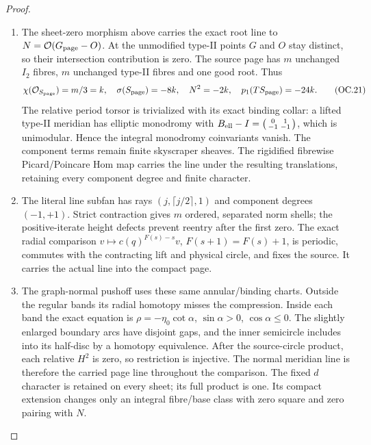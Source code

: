 \begin{proof}
\begin{enumerate}[label=\arabic*.]
\par

\medskip\noindent\textbf{5. The actual component line, cap markings and physical pair}

\par\nobreak

\item The sheet-zero morphism above carries the exact root line to
\(N=\mathcal O(G_{\rm page}-O)\). At the unmodified type-II points
\(G\) and \(O\) stay distinct, so their intersection contribution
is zero. The source page has \(m\) unchanged \(I_2\) fibres,
\(m\) unchanged type-II fibres and one good root. Thus
\[
\chi(\mathcal O_{S_{\rm page}})=m/3=k,\quad
\sigma(S_{\rm page})=-8k,\quad N^2=-2k,
\quad p_1(TS_{\rm page})=-24k.
\tag{OC.21}
\]
The relative period torsor is trivialized with its exact binding
collar: a lifted type-II meridian has elliptic monodromy with
\(B_{\rm ell}-I=\left(\begin{smallmatrix}0&1\\-1&-1\end{smallmatrix}\right)\),
which is unimodular. Hence the integral monodromy coinvariants
vanish. The component terms remain finite skyscraper sheaves.
The rigidified fibrewise Picard/Poincare Hom map carries the line
under the resulting translations, retaining every component degree
and finite character.

\item The literal line subfan has rays \((j,\lceil j/2\rceil,1)\) and
component degrees \((-1,+1)\). Strict contraction gives \(m\)
ordered, separated norm shells; the positive-iterate height defects
prevent reentry after the first zero. The exact radial comparison
\(v\mapsto c(q)^{F(s)-s}v\), \(F(s+1)=F(s)+1\), is periodic,
commutes with the contracting lift and physical circle, and fixes
the source. It carries the actual line into the compact page.

\item The graph-normal pushoff uses these same annular/binding charts.
Outside the regular bands its radial homotopy misses the compression.
Inside each band the exact equation is
\(\rho=-\eta_0\cot\alpha\), \(\sin\alpha>0\), \(\cos\alpha\le0\).
The slightly enlarged boundary arcs have disjoint gaps, and the
inner semicircle includes into its half-disc by a homotopy
equivalence. After the source-circle product, each relative
\(H^2\) is zero, so restriction is injective. The normal meridian
line is therefore the carried page line throughout the comparison.
The fixed \(d\) character is retained on every sheet; its full
product is one. Its compact extension changes only an integral
fibre/base class with zero square and zero pairing with \(N\).


\end{enumerate}
\end{proof}
